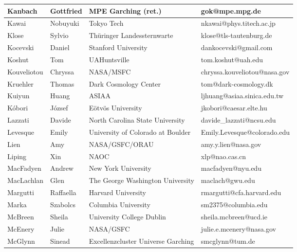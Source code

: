 \begin{center}
\begin{longtable}{|p{1.28cm} |p{1.28cm} |p{2.9cm} |p{3cm} |}
\tiny Kanbach &\tiny Gottfried & \tiny MPE Garching (ret.) & \tiny gok@mpe.mpg.de \\ \hline
\tiny Kawai &\tiny Nobuyuki & \tiny Tokyo Tech & \tiny nkawai@phys.titech.ac.jp \\ \hline
\tiny Klose &\tiny Sylvio & \tiny Th\"uringer Landessternwarte & \tiny klose@tls-tautenburg.de \\ \hline
\tiny Kocevski &\tiny Daniel & \tiny Stanford University & \tiny dankocevski@gmail.com \\ \hline
\tiny Koshut &\tiny Tom & \tiny UAHuntsville & \tiny tom.koshut@uah.edu \\ \hline
\tiny Kouveliotou &\tiny Chryssa & \tiny NASA/MSFC & \tiny chryssa.kouveliotou@nasa.gov \\ \hline
\tiny Kruehler &\tiny Thomas & \tiny Dark Cosmology Center & \tiny tom@dark-cosmology.dk \\ \hline
\tiny Kuiyun &\tiny Huang & \tiny ASIAA & \tiny ljhuang@asiaa.sinica.edu.tw \\ \hline
\tiny K\'obori &\tiny J\'ozsef & \tiny E\"otv\"os University & \tiny jkobori@caesar.elte.hu \\ \hline
\tiny Lazzati &\tiny Davide & \tiny North Carolina State University & \tiny davide\_lazzati@ncsu.edu \\ \hline
\tiny Levesque &\tiny Emily & \tiny University of Colorado at Boulder & \tiny Emily.Levesque@colorado.edu \\ \hline
\tiny Lien &\tiny Amy & \tiny NASA/GSFC/ORAU & \tiny amy.y.lien@nasa.gov \\ \hline
\tiny Liping &\tiny Xin & \tiny NAOC & \tiny xlp@nao.cas.cn \\ \hline
\tiny MacFadyen &\tiny Andrew & \tiny New York University & \tiny macfadyen@nyu.edu \\ \hline
\tiny MacLachlan &\tiny Glen & \tiny The George Washington University & \tiny maclach@gwu.edu \\ \hline
\tiny Margutti &\tiny Raffaella & \tiny Harvard University & \tiny rmargutti@cfa.harvard.edu \\ \hline
\tiny Marka &\tiny Szabolcs & \tiny Columbia University & \tiny sm2375@columbia.edu \\ \hline
\tiny McBreen &\tiny Sheila & \tiny University College Dublin & \tiny sheila.mcbreen@ucd.ie \\ \hline
\tiny McEnery &\tiny Julie & \tiny NASA/GSFC & \tiny julie.e.mcenery@nasa.gov \\ \hline
\tiny McGlynn &\tiny Sinead & \tiny Excellenzcluster Universe Garching & \tiny smcglynn@tum.de \\ \hline

\end{longtable}
\end{center}
